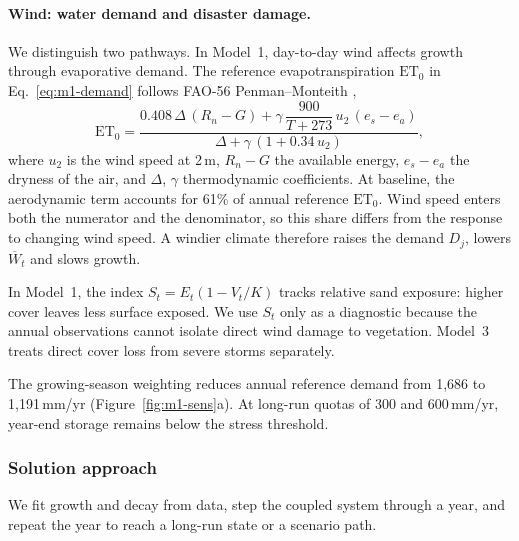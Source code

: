 \paragraph{Wind: water demand and disaster damage.} We distinguish two pathways. In Model~1, day-to-day wind affects growth through evaporative demand. The reference evapotranspiration $\mathrm{ET}_0$ in Eq.~\eqref{eq:m1-demand} follows FAO-56 Penman--Monteith \cite{REF11},
\begin{equation}\label{eq:m1-pm}
\mathrm{ET}_0=\frac{0.408\,\Delta\,(R_n-G)+\gamma\,\dfrac{900}{T+273}\,u_2\,(e_s-e_a)}{\Delta+\gamma\,(1+0.34\,u_2)},
\end{equation}
where $u_2$ is the wind speed at 2\,m, $R_n-G$ the available energy, $e_s-e_a$ the dryness of the air, and $\Delta$, $\gamma$ thermodynamic coefficients. At baseline, the aerodynamic term accounts for 61\% of annual reference $\mathrm{ET}_0$. Wind speed enters both the numerator and the denominator, so this share differs from the response to changing wind speed. A windier climate therefore raises the demand $D_j$, lowers $\overline W_t$ and slows growth.

In Model~1, the index $S_t=E_t(1-V_t/K)$ tracks relative sand exposure: higher cover leaves less surface exposed. We use $S_t$ only as a diagnostic because the annual observations cannot isolate direct wind damage to vegetation. Model~3 treats direct cover loss from severe storms separately.

The growing-season weighting reduces annual reference demand from 1,686 to 1,191\,mm/yr (Figure~\ref{fig:m1-sens}a). At long-run quotas of 300 and 600\,mm/yr, year-end storage remains below the stress threshold.

\subsubsection[Least-Squares Calibration and Long-Run Simulation]{Solution approach}
We fit growth and decay from data, step the coupled system through a year, and repeat the year to reach a long-run state or a scenario path.

